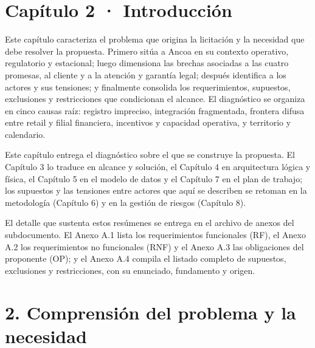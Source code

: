 \documentclass[11pt]{article}
\begin{document}
\renewcommand{\tablename}{Tabla}
\renewcommand{\figurename}{Figura}
\renewcommand{\thetable}{2.\arabic{table}}
\renewcommand{\thefigure}{2.\arabic{figure}}

\tableofcontents
\clearpage
\renewcommand{\listfigurename}{Lista de figuras}
\listoffigures
\clearpage
\renewcommand{\listtablename}{Lista de tablas}
\listoftables
\clearpage

\section{Capítulo 2 · Introducción}\label{capitulo-2-introduccion}

Este capítulo caracteriza el problema que origina la licitación y la necesidad que debe resolver la propuesta. Primero sitúa a Ancoa en su contexto operativo, regulatorio y estacional; luego dimensiona las brechas asociadas a las cuatro promesas, al cliente y a la atención y garantía legal; después identifica a los actores y sus tensiones; y finalmente consolida los requerimientos, supuestos, exclusiones y restricciones que condicionan el alcance. El diagnóstico se organiza en cinco causas raíz: registro impreciso, integración fragmentada, frontera difusa entre retail y filial financiera, incentivos y capacidad operativa, y territorio y calendario.

Este capítulo entrega el diagnóstico sobre el que se construye la propuesta. El Capítulo 3 lo traduce en alcance y solución, el Capítulo 4 en arquitectura lógica y física, el Capítulo 5 en el modelo de datos y el Capítulo 7 en el plan de trabajo; los supuestos y las tensiones entre actores que aquí se describen se retoman en la metodología (Capítulo 6) y en la gestión de riesgos (Capítulo 8).

El detalle que sustenta estos resúmenes se entrega en el archivo de anexos del subdocumento. El Anexo A.1 lista los requerimientos funcionales (RF), el Anexo A.2 los requerimientos no funcionales (RNF) y el Anexo A.3 las obligaciones del proponente (OP); y el Anexo A.4 compila el listado completo de supuestos, exclusiones y restricciones, con su enunciado, fundamento y origen.

\section{2. Comprensión del problema y la necesidad}\label{comprension-del-problema-y-la-necesidad}
\end{document}
